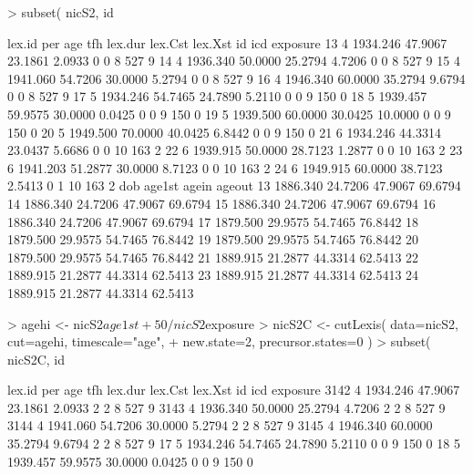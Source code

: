 \documentclass[a4paper,twoside,12pt]{article}
\begin{document}
\begin{Schunk}
\begin{Sinput}
> subset( nicS2, id %in% 8:10 )
\end{Sinput}
\begin{Soutput}
   lex.id      per     age     tfh lex.dur lex.Cst lex.Xst id icd exposure
13      4 1934.246 47.9067 23.1861  2.0933       0       0  8 527        9
14      4 1936.340 50.0000 25.2794  4.7206       0       0  8 527        9
15      4 1941.060 54.7206 30.0000  5.2794       0       0  8 527        9
16      4 1946.340 60.0000 35.2794  9.6794       0       0  8 527        9
17      5 1934.246 54.7465 24.7890  5.2110       0       0  9 150        0
18      5 1939.457 59.9575 30.0000  0.0425       0       0  9 150        0
19      5 1939.500 60.0000 30.0425 10.0000       0       0  9 150        0
20      5 1949.500 70.0000 40.0425  6.8442       0       0  9 150        0
21      6 1934.246 44.3314 23.0437  5.6686       0       0 10 163        2
22      6 1939.915 50.0000 28.7123  1.2877       0       0 10 163        2
23      6 1941.203 51.2877 30.0000  8.7123       0       0 10 163        2
24      6 1949.915 60.0000 38.7123  2.5413       0       1 10 163        2
        dob  age1st   agein  ageout
13 1886.340 24.7206 47.9067 69.6794
14 1886.340 24.7206 47.9067 69.6794
15 1886.340 24.7206 47.9067 69.6794
16 1886.340 24.7206 47.9067 69.6794
17 1879.500 29.9575 54.7465 76.8442
18 1879.500 29.9575 54.7465 76.8442
19 1879.500 29.9575 54.7465 76.8442
20 1879.500 29.9575 54.7465 76.8442
21 1889.915 21.2877 44.3314 62.5413
22 1889.915 21.2877 44.3314 62.5413
23 1889.915 21.2877 44.3314 62.5413
24 1889.915 21.2877 44.3314 62.5413
\end{Soutput}
\begin{Sinput}
> agehi <- nicS2$age1st + 50 / nicS2$exposure
> nicS2C <- cutLexis( data=nicS2, cut=agehi, timescale="age",
+                     new.state=2, precursor.states=0 )
> subset( nicS2C, id %in% 8:10 )
\end{Sinput}
\begin{Soutput}
     lex.id      per     age     tfh lex.dur lex.Cst lex.Xst id icd exposure
3142      4 1934.246 47.9067 23.1861  2.0933       2       2  8 527        9
3143      4 1936.340 50.0000 25.2794  4.7206       2       2  8 527        9
3144      4 1941.060 54.7206 30.0000  5.2794       2       2  8 527        9
3145      4 1946.340 60.0000 35.2794  9.6794       2       2  8 527        9
17        5 1934.246 54.7465 24.7890  5.2110       0       0  9 150        0
18        5 1939.457 59.9575 30.0000  0.0425       0       0  9 150        0

\end{Soutput}
\end{Schunk}
\end{document}
